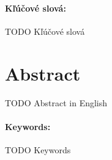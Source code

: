 \documentclass[12pt, twoside]{book}
\begin{document}
\paragraph*{Kľúčové slová:} TODO Kľúčové slová


\newpage 
\section*{Abstract}

TODO Abstract in English


\paragraph*{Keywords:} TODO Keywords


%
%



\newpage 

\tableofcontents



\newpage 

\listoffigures
\listoftables


\mainmatter


 

%








\end{document}
